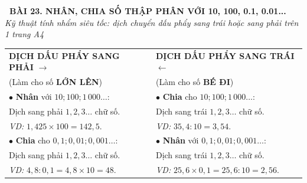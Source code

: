 \documentclass[14pt,a4paper,oneside]{extbook}
\begin{document}
\noindent
\begin{tcolorbox}[
  enhanced,
  colback=teal!8!white,
  colframe=teal!80!black,
  arc=3mm,
  boxrule=1.1pt,
  width=\linewidth,
  halign=center,
  top=2.2mm, bottom=2.2mm,
  left=3mm, right=3mm,
  drop fuzzy shadow
]
  {\large\bfseries\color{teal!95!black}\faBookmark\ BÀI 23. NHÂN, CHIA SỐ THẬP PHÂN VỚI 10, 100, 0.1, 0.01...}\\[2pt]
  {\scriptsize\color{black!75}\itshape Kỹ thuật tính nhẩm siêu tốc: dịch chuyển dấu phẩy sang trái hoặc sang phải trên 1 trang A4}
\end{tcolorbox}

\vspace{3.2mm}
\noindent
\begin{tcolorbox}[
  enhanced,
  title={\footnotesize\bfseries\color{white}\faBolt\ 1. Bảng thần chú tính nhẩm siêu tốc},
  colback=blue!2!white,
  colframe=blue!75!black,
  arc=2.5mm, boxrule=0.8pt, top=1.8mm, bottom=1.8mm, left=2.5mm, right=2.5mm
]
  \footnotesize
  \begin{tabular}{p{}|p{}}
    \textbf{DỊCH DẤU PHẨY SANG PHẢI} $\longrightarrow$ & \textbf{DỊCH DẤU PHẨY SANG TRÁI} $\longleftarrow$ \\
    (Làm cho số \textbf{LỚN LÊN}) & (Làm cho số \textbf{BÉ ĐI}) \\ \hline
    $\bullet$ \textbf{Nhân} với $10; 100; 1\,000\dots$: & $\bullet$ \textbf{Chia} cho $10; 100; 1\,000\dots$: \\
    Dịch sang phải $1, 2, 3\dots$ chữ số. & Dịch sang trái $1, 2, 3\dots$ chữ số. \\
    \textit{VD:} $1,425 \times 100 = 142,5$. & \textit{VD:} $35,4 : 10 = 3,54$. \\[2pt]
    $\bullet$ \textbf{Chia} cho $0,1; 0,01; 0,001\dots$: & $\bullet$ \textbf{Nhân} với $0,1; 0,01; 0,001\dots$: \\
    Dịch sang phải $1, 2, 3\dots$ chữ số. & Dịch sang trái $1, 2, 3\dots$ chữ số. \\
    \textit{VD:} $4,8 : 0,1 = 4,8 \times 10 = 48$. & \textit{VD:} $25,6 \times 0,1 = 25,6 : 10 = 2,56$.
  \end{tabular}
\end{tcolorbox}

\vspace{3mm}
\end{document}
